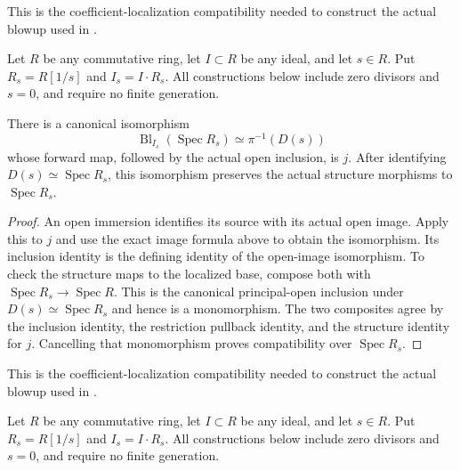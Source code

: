 \endgroup

\begingroup

This is the coefficient-localization compatibility needed to construct the
actual blowup used in \cite[4.8]{deJong}.

Let $R$ be any commutative ring, let $I\subset R$ be any ideal, and let
$s\in R$. Put $R_s=R[1/s]$ and $I_s=I\cdot R_s$. All constructions below
include zero divisors and $s=0$, and require no finite generation.

\begin{theorem}\label{thm:affine-blowup-localization-iso}
\leanok
There is a canonical isomorphism
\[\operatorname{Bl}_{I_s}(\operatorname{Spec}R_s)\simeq\pi^{-1}(D(s))\]
whose forward map, followed by the actual open inclusion, is $j$.
After identifying $D(s)\simeq\operatorname{Spec}R_s$, this isomorphism
preserves the actual structure morphisms to $\operatorname{Spec}R_s$.
\end{theorem}
\begin{proof}
An open immersion identifies its source with its actual open image. Apply
this to $j$ and use the exact image formula above to obtain the isomorphism.
Its inclusion identity is the defining identity of the open-image
isomorphism. To check the structure maps to the localized base, compose
both with $\operatorname{Spec}R_s\to\operatorname{Spec}R$. This is the
canonical principal-open inclusion under $D(s)\simeq\operatorname{Spec}R_s$
and hence is a monomorphism. The two composites agree by the inclusion
identity, the restriction pullback identity, and the structure identity
for $j$. Cancelling that monomorphism proves compatibility over
$\operatorname{Spec}R_s$.
\end{proof}

\endgroup

\begingroup

This is the coefficient-localization compatibility needed to construct the
actual blowup used in \cite[4.8]{deJong}.

Let $R$ be any commutative ring, let $I\subset R$ be any ideal, and let
$s\in R$. Put $R_s=R[1/s]$ and $I_s=I\cdot R_s$. All constructions below
include zero divisors and $s=0$, and require no finite generation.

